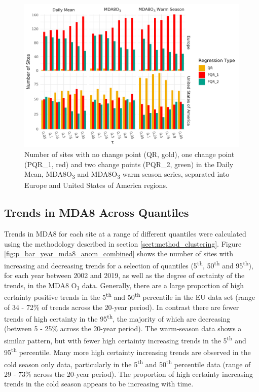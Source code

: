\documentclass[journal abbreviation, manuscript]{copernicus}
\begin{document}
\begin{figure}[h!]
\includegraphics[width=12cm]{figures/paper_figures/regression_type_bars_o3.pdf}
\caption{Number of sites with no change point (QR, gold), one change point (PQR\_1, red) and two change points (PQR\_2, green) in the Daily Mean, MDA8O\textsubscript{3} and MDA8O\textsubscript{3} warm season series, separated into Europe and United States of America regions.}
\label{fig:regression_type}
\end{figure}




\subsection{Trends in MDA8 Across Quantiles} \label{sect:new_mda8_trends}

Trends in MDA8 for each site at a range of different quantiles were calculated using the methodology described in section \ref{sect:method_clustering}. Figure \ref{fig:p_bar_year_mda8_anom_combined} shows the number of sites with increasing and decreasing trends for a selection of quantiles (5\textsuperscript{th}, 50\textsuperscript{th} and 95\textsuperscript{th}), for each year between 2002 and 2019, as well as the degree of certainty of the trends, in the MDA8 O$_3$ data. Generally, there are a large proportion of high certainty positive trends in the 5\textsuperscript{th} and 50\textsuperscript{th} percentile in the EU data set (range of 34 - 72\% of trends across the 20-year period). In contrast there are fewer trends of high certainty in the 95\textsuperscript{th}, the majority of which are decreasing (between 5 - 25\% across the 20-year period). The warm-season data shows a similar pattern, but with fewer high certainty increasing trends in the 5\textsuperscript{th} and 95\textsuperscript{th} percentile. Many more high certainty increasing trends are observed in the cold season only data, particularly in the 5\textsuperscript{th} and 50\textsuperscript{th} percentile data (range of 29 - 73\% across the 20-year period). The proportion of high certainty increasing trends in the cold season appears to be increasing with time.
\end{document}
